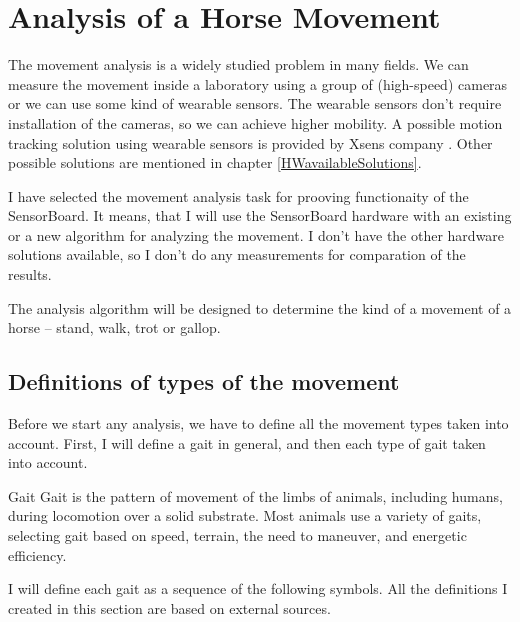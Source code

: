 \chapter{Analysis of a Horse Movement}
\label{HorseAnalysis}
The movement analysis is a widely studied problem in many fields. We can measure the movement inside a laboratory using a group of (high-speed) cameras or we can use some kind of wearable sensors. The wearable sensors don't require installation of the cameras, so we can achieve higher mobility. A possible motion tracking solution using wearable sensors is provided by Xsens company \cite{Xsens:MVN}. Other possible solutions are mentioned in chapter \ref{HWavailableSolutions}.

I have selected the movement analysis task for prooving functionaity of the SensorBoard. It means, that I will use the SensorBoard hardware with an existing or a new algorithm for analyzing the movement. I don't have the other hardware solutions available, so I don't do any measurements for comparation of the results.

The analysis algorithm will be designed to determine the kind of a movement of a horse -- stand, walk, trot or gallop.

\section{Definitions of types of the movement}
\label{definitionsOfGaits}
Before we start any analysis, we have to define all the movement types taken into account. First, I will define a gait in general, and then each type of gait taken into account.

\begin{definition}{Gait}
	\label{def:gait}
	Gait is the pattern of movement of the limbs of animals, including humans, during locomotion over a solid substrate. Most animals use a variety of gaits, selecting gait based on speed, terrain, the need to maneuver, and energetic efficiency. \cite{Higgins2009}
\end{definition}

I will define each gait as a sequence of the following symbols. All the definitions I created in this section are based on external sources. \cite{Duruttya2005} \cite{Higgins2009} \cite{Harrisc1993}

